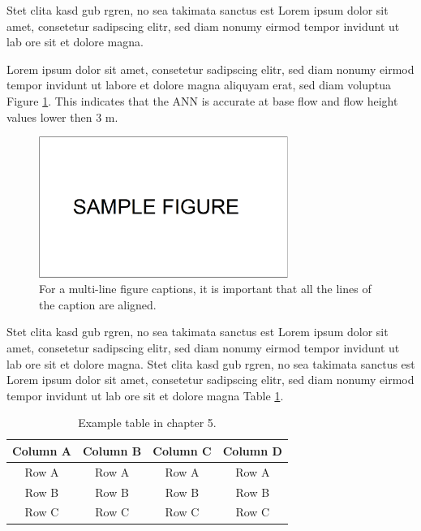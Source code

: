 Stet clita kasd gub rgren, no sea takimata sanctus est Lorem ipsum dolor sit amet, consetetur sadipscing elitr, sed diam nonumy eirmod tempor invidunt ut lab ore sit et dolore magna. 


Lorem ipsum dolor sit amet, consetetur sadipscing elitr, sed diam nonumy eirmod tempor invidunt ut labore et dolore magna aliquyam erat, sed diam voluptua Figure \ref{fig:ch5-1}. This indicates that the ANN is accurate at base flow and flow height values lower then 3 m. 

\vspace{6pt} %
\begin{figure}[!ht]
    \centering
    \includegraphics[width=230pt,keepaspectratio=true]{./fig/sekil5}
    \caption{For a multi-line figure captions, it is important that all the
    lines of the caption are aligned.}
    \label{fig:ch5-1}
\end{figure}
\vspace{-9pt} %

Stet clita kasd gub rgren, no sea takimata sanctus est Lorem ipsum dolor sit amet, consetetur sadipscing elitr, sed diam nonumy eirmod tempor invidunt ut lab ore sit et dolore magna. Stet clita kasd gub rgren, no sea takimata sanctus est Lorem ipsum dolor sit amet, consetetur sadipscing elitr, sed diam nonumy eirmod tempor invidunt ut lab ore sit et dolore magna Table \ref{table:ch5-1}.

\vspace{6pt} %
\begin{table}[!ht]
\centering
\setlength{\tabcolsep}{14pt}
\caption{Example table in chapter 5.}
\begin{tabular}{cccc}
\toprule\midrule
Column A & Column B & Column C & Column D \\
\midrule
Row A & Row A & Row A & Row A \\
Row B & Row B & Row B & Row B \\
Row C & Row C & Row C & Row C \\
\bottomrule
\end{tabular}
\label{table:ch5-1}
\end{table}
\vspace{-9pt} %

